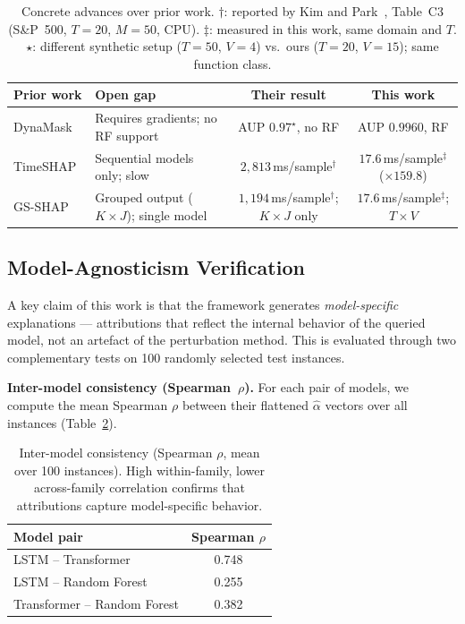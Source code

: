 \documentclass[runningheads]{llncs}
\newcommand{\cmark}{\checkmark}
\begin{document}
\begin{table}[ht]
\caption{Concrete advances over prior work.
  $\dagger$: reported by Kim and Park~\cite{gsshap2026}, Table~C3
  (S\&P~500, $T{=}20$, $M{=}50$, CPU).
  $\ddagger$: measured in this work, same domain and $T$.
  $\star$: different synthetic setup ($T{=}50$, $V{=}4$) vs.\
  ours ($T{=}20$, $V{=}15$); same function class.}
\label{tab:advances}
\centering
\scriptsize
\setlength{\tabcolsep}{4pt}
\begin{tabular}{lp{2.8cm}cc}
\toprule
\textbf{Prior work} & \textbf{Open gap} &
\textbf{Their result} & \textbf{This work} \\
\midrule
DynaMask~\cite{crabbe2021}
  & Requires gradients; no RF support
  & AUP $0.97^{\star}$, no RF
  & AUP $\mathbf{0.9960}$, RF \cmark \\[2pt]
TimeSHAP~\cite{bento2021}
  & Sequential models only; slow
  & $2{,}813$\,ms/sample$^{\dagger}$
  & $\mathbf{17.6}$\,ms/sample$^{\ddagger}$ (${\times}159.8$) \\[2pt]
GS-SHAP~\cite{gsshap2026}
  & Grouped output ($K{\times}J$); single model
  & $1{,}194$\,ms/sample$^{\dagger}$; $K{\times}J$ only
  & $\mathbf{17.6}$\,ms/sample$^{\ddagger}$; $T{\times}V$ \cmark \\
\bottomrule
\end{tabular}
\end{table}

\subsection{Model-Agnosticism Verification}
\label{sec:agnosticism}

A key claim of this work is that the framework generates
\emph{model-specific} explanations --- attributions that reflect the
internal behavior of the queried model, not an artefact of the
perturbation method. This is evaluated through two complementary
tests on 100 randomly selected test instances.

\textbf{Inter-model consistency (Spearman~$\rho$).}
For each pair of models, we compute the mean Spearman $\rho$ between
their flattened $\hat{\alpha}$ vectors over all instances
(Table~\ref{tab:consistency}).

\begin{table}[ht]
\caption{Inter-model consistency (Spearman $\rho$, mean over 100
instances). High within-family, lower across-family correlation
confirms that attributions capture model-specific behavior.}
\label{tab:consistency}
\centering
\begin{tabular}{lc}
\toprule
\textbf{Model pair} & \textbf{Spearman $\rho$} \\
\midrule
LSTM -- Transformer          & 0.748 \\
LSTM -- Random Forest        & 0.255 \\
Transformer -- Random Forest & 0.382 \\
\bottomrule
\end{tabular}
\end{table}
\end{document}
